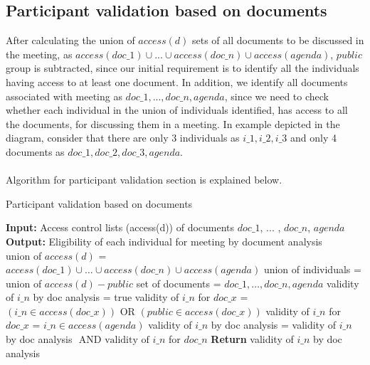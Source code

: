 \subsection{Participant validation based on documents}
After calculating the union of $access(d)$ sets of all documents to be discussed in the meeting, as $access(doc\_1) \cup ... \cup access(doc\_n) \cup access(agenda)$, $public$ group is subtracted, since our initial requirement is to identify all the individuals having access to at least one document. In addition, we identify all documents associated with meeting as $doc\_1, ..., doc\_n, agenda$, since we need to check whether each individual in the union of individuals identified, has access to all the documents, for discussing them in a meeting. In example depicted in the diagram, consider that there are only 3 individuals as $i\_1, i\_2, i\_3$ and only 4 documents as $doc\_1, doc\_2, doc\_3, agenda$.\\ \\
Algorithm for participant validation section is explained below.
\begin{algorithm}[H]
    \caption{Participant validation based on documents}
    \begin{algorithmic}
        \State \textbf{Input:} Access control lists (access(d)) of documents \(doc\_1\), ... , \(doc\_n\), \(agenda\)
        \State \textbf{Output:} Eligibility of each individual for meeting by document analysis \\
        \State union of \(access(d)\) = \(access(doc\_1) \cup \dots \cup access(doc\_n) \cup access(agenda)\)
        \State union of individuals = union of \(access(d) - public \)
        \State set of documents = \(doc\_1, \dots , doc\_n , agenda\)
            \State validity of \(i\_n\) by doc analysis = true
                    \State validity of \(i\_n\) for \(doc\_x\) = \((i\_n \in access(doc\_x)) \text{ OR } (public \in access(doc\_x))\)
                \Else
                    \State validity of \(i\_n\) for \(doc\_x\) = \(i\_n \in access(agenda)\)
                \EndIf
                \State validity of \(i\_n\) by doc analysis = validity of  \(i\_n\) by doc analysis \(\text{ AND validity of } i\_n\) for \(doc\_n\)
            \EndFor
            \State \textbf{Return} validity of \(i\_n\) by doc analysis
        \EndFor
    \end{algorithmic}
\end{algorithm}
